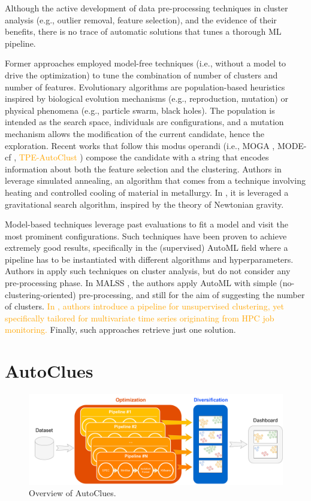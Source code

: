 \documentclass[runningheads]{llncs}
\begin{document}
Although the active development of data pre-processing techniques in cluster analysis (e.g., outlier removal, feature selection), and the evidence of their benefits, there is no trace of automatic solutions that tunes a thorough ML pipeline.

Former approaches employed model-free techniques (i.e., without a model to drive the optimization) to tune the combination of number of clusters and number of features.
Evolutionary algorithms are population-based heuristics inspired by biological evolution mechanisms (e.g., reproduction, mutation) or physical phenomena (e.g., particle swarm, black holes).
The population is intended as the search space, individuals are configurations, and a mutation mechanism allows the modification of the current candidate, hence the exploration.
Recent works that follow this modus operandi (i.e., MOGA \cite{dutta2013}, MODE-cf \cite{hancer2020new}, \textcolor{orange}{TPE-AutoClust \cite{10031132}}) compose the candidate with a string that encodes information about both the feature selection and the clustering.
Authors in \cite{simulate_annealing} leverage simulated annealing, an algorithm that comes from a technique involving heating and controlled cooling of material in metallurgy.
In \cite{prakash2019gravitational}, it is leveraged a gravitational search algorithm, inspired by the theory of Newtonian gravity.

Model-based techniques leverage past evaluations to fit a model and visit the most prominent configurations.
Such techniques have been proven to achieve extremely good results, specifically in the (supervised) AutoML field where a pipeline has to be instantiated with different algorithms and hyperparameters.
Authors in \cite{Tschechlov2021,poulakis2020autoclust,Liu2021} apply such techniques on cluster analysis, but do not consider any pre-processing phase.
In MALSS \cite{Kamoshida2020}, the authors apply AutoML with simple (no-clustering-oriented) pre-processing, and still for the aim of suggesting the number of clusters.
\textcolor{orange}{In \cite{ENES20231}, authors introduce a pipeline for unsupervised clustering, yet specifically tailored for multivariate time series originating from HPC job monitoring.}
Finally, such approaches retrieve just one solution.

\section{AutoClues}\label{sec:autoclues}

\begin{figure}[t]
    \centering
    \includegraphics[scale=.26]{img/approach.pdf}
    \caption{Overview of AutoClues.}
    \label{fig:overview}
\end{figure}
\end{document}
